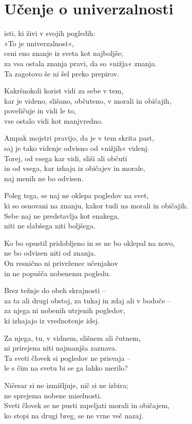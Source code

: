 \cleartorecto
{}
\chapter{Učenje o univerzalnosti}

isti, ki živi v svojih pogledih:\\
»To je univerzalnost«,\\
ceni eno znanje iz sveta kot najboljše;\\
za vsa ostala znanja pravi, da so »nižja« znanja.\\
Ta zagotovo še ni šel preko prepirov.

Kakršnokoli korist vidi za sebe v tem,\\
kar je videno, slišano, občuteno, v morali in običajih,\\
poveličuje in vidi le to,\\
vse ostalo vidi kot manjvredno.

\clearpage

Ampak mojstri pravijo, da je v tem skrita past,\\
saj je tako videnje odvisno od »nižjih« videnj.\\
Torej, od vsega kar vidi, sliši ali občuti\\
in od vsega, kar izhaja iz običajev in morale,\\\vin naj menih ne bo odvisen.

Poleg tega, se naj ne oklepa pogledov na svet,\\
ki so osnovani na znanju, kakor tudi na morali in običajih.\\
Sebe naj ne predstavlja kot enakega,\\
niti ne slabšega niti boljšega.

Ko bo opustil pridobljeno in se ne bo oklepal na novo,\\
ne bo odvisen niti od znanja.\\
On resnično ni privrženec učenjakov\\
in ne popušča nobenemu pogledu.

Brez težnje do obeh skrajnosti --\\
za ta ali drugi obstoj, za tukaj in zdaj ali v bodoče --\\
za njega ni nobenih utrjenih pogledov,\\
ki izhajajo iz vrednotenje idej.

Za njega, tu, v vidnem, slišnem ali čutnem,\\
ni prirejena niti najmanjša zaznava.\\
Ta sveti človek si pogledov ne prisvaja --\\
le s čim na svetu bi se ga lahko merilo?

Ničesar si ne izmišljuje, nič si ne izbira;\\
ne sprejema nobene miselnosti.\\
Sveti človek se ne pusti zapeljati morali in običajem,\\
ko stopi na drugi breg, se ne vrne več nazaj.

